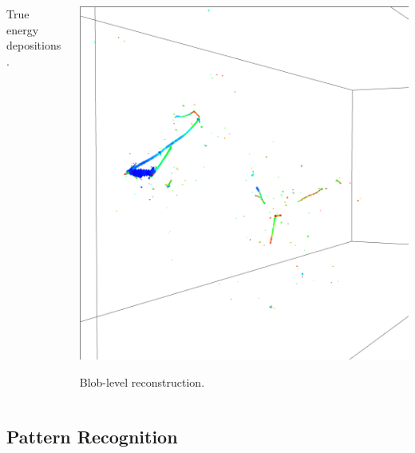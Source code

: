 \documentclass[xcolor=dvipsnames]{beamer}
\begin{document}
\begin{frame}[fragile]
\begin{columns}
\begin{column}{0.5\textwidth}
\begin{center}
        True energy depositions.
      \end{center}
    \end{column}
    \begin{column}{0.5\textwidth}
      \begin{center}
        \includegraphics[width=\textwidth]{payoff-reco.png}

        Blob-level reconstruction.
      \end{center}
    \end{column}
  \end{columns}
\end{frame}


\subsection{Pattern Recognition}
\end{document}
